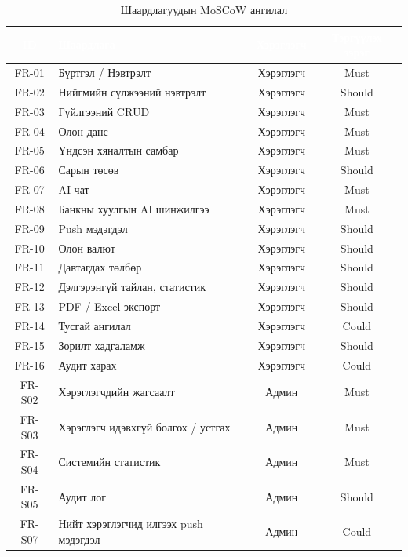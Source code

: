 \begin{table}[ht]
\centering
\footnotesize
\renewcommand{\arraystretch}{1.2}
\begin{tabular}{|c|p{7.5cm}|c|c|}
\hline
\rowcolor{darknavy}
\textcolor{white}{\textbf{ID}} & \textcolor{white}{\textbf{Шаардлага}} & \textcolor{white}{\textbf{Хэрэглэгч}} & \textcolor{white}{\textbf{Тэргүүлэх зэрэг}} \\ \hline
FR-01 & Бүртгэл / Нэвтрэлт                  & Хэрэглэгч & Must   \\ \hline
FR-02 & Нийгмийн сүлжээний нэвтрэлт          & Хэрэглэгч & Should \\ \hline
FR-03 & Гүйлгээний CRUD                      & Хэрэглэгч & Must   \\ \hline
FR-04 & Олон данс                            & Хэрэглэгч & Must   \\ \hline
FR-05 & Үндсэн хяналтын самбар               & Хэрэглэгч & Must   \\ \hline
FR-06 & Сарын төсөв                          & Хэрэглэгч & Should \\ \hline
FR-07 & AI чат                               & Хэрэглэгч & Must   \\ \hline
FR-08 & Банкны хуулгын AI шинжилгээ          & Хэрэглэгч & Must   \\ \hline
FR-09 & Push мэдэгдэл                        & Хэрэглэгч & Should \\ \hline
FR-10 & Олон валют                           & Хэрэглэгч & Should \\ \hline
FR-11 & Давтагдах төлбөр                     & Хэрэглэгч & Should \\ \hline
FR-12 & Дэлгэрэнгүй тайлан, статистик        & Хэрэглэгч & Should \\ \hline
FR-13 & PDF / Excel экспорт                  & Хэрэглэгч & Should \\ \hline
FR-14 & Тусгай ангилал                       & Хэрэглэгч & Could  \\ \hline
FR-15 & Зорилт хадгаламж                     & Хэрэглэгч & Should \\ \hline
FR-16 & Аудит харах                          & Хэрэглэгч & Could  \\ \hline
FR-S02 & Хэрэглэгчдийн жагсаалт               & Админ      & Must   \\ \hline
FR-S03 & Хэрэглэгч идэвхгүй болгох / устгах   & Админ      & Must   \\ \hline
FR-S04 & Системийн статистик                  & Админ      & Must   \\ \hline
FR-S05 & Аудит лог                            & Админ      & Should \\ \hline
FR-S07 & Нийт хэрэглэгчид илгээх push мэдэгдэл & Админ      & Could  \\ \hline
\end{tabular}
\caption{Шаардлагуудын MoSCoW ангилал}
\label{tab:moscow}
\end{table}

